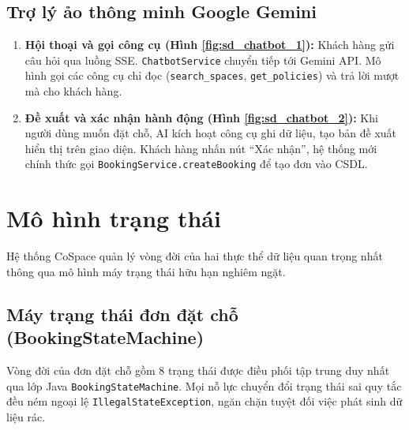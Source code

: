 
\subsection{Trợ lý ảo thông minh Google Gemini}
\label{ssec:seq_chatbot}
\begin{enumerate}
    \item \textbf{Hội thoại và gọi công cụ (Hình \ref{fig:sd_chatbot_1}):} Khách hàng gửi câu hỏi qua luồng SSE. \texttt{ChatbotService} chuyển tiếp tới Gemini API. Mô hình gọi các công cụ chỉ đọc (\texttt{search\_spaces}, \texttt{get\_policies}) và trả lời mượt mà cho khách hàng.
    \item \textbf{Đề xuất và xác nhận hành động (Hình \ref{fig:sd_chatbot_2}):} Khi người dùng muốn đặt chỗ, AI kích hoạt công cụ ghi dữ liệu, tạo bản đề xuất hiển thị trên giao diện. Khách hàng nhấn nút ``Xác nhận'', hệ thống mới chính thức gọi \texttt{BookingService.createBooking} để tạo đơn vào CSDL.
\end{enumerate}


\clearpage
\section{Mô hình trạng thái}
\label{sec:statechart}

Hệ thống CoSpace quản lý vòng đời của hai thực thể dữ liệu quan trọng nhất thông qua mô hình máy trạng thái hữu hạn nghiêm ngặt.

\subsection{Máy trạng thái đơn đặt chỗ (BookingStateMachine)}
Vòng đời của đơn đặt chỗ gồm 8 trạng thái được điều phối tập trung duy nhất qua lớp Java \texttt{BookingStateMachine}. Mọi nỗ lực chuyển đổi trạng thái sai quy tắc đều ném ngoại lệ \texttt{IllegalStateException}, ngăn chặn tuyệt đối việc phát sinh dữ liệu rác.


